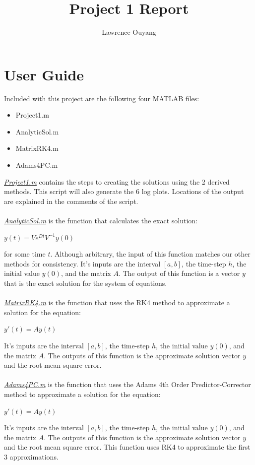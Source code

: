 \documentclass[12pt]{article}
\title{Project 1 Report}
\author{Lawrence Ouyang}
\begin{document}
\maketitle
\section{User Guide}
Included with this project are the following four MATLAB files:
\begin{itemize}
\item Project1.m
\item AnalyticSol.m
\item MatrixRK4.m 
\item Adams4PC.m
\end{itemize}

\underline{\textit{Project1.m}} contains the steps to creating the solutions using the 2 derived methods. This script will also generate the 6 log plots. Locations of the output are explained in the comments of the script.\\ \\

\underline{\textit{AnalyticSol.m}} is the function that calculates the exact solution:
\begin{center}
$y(t) = Ve^{Dt}V^{-1}y(0) $
\end{center}
for some time $t$. Although arbitrary, the input of this function matches our other methods for consistency. It's inputs are the interval $[a,b]$, the time-step $h$, the initial value $y(0)$, and the matrix $A$. The output of this function is a vector $y$ that is the exact solution for the system of equations.\\ \\

\underline{\textit{MatrixRK4.m}} is the function that uses the RK4 method to approximate a solution for the equation:
\begin{center}
$y'(t) = Ay(t) $
\end{center}
It's inputs are the interval $[a,b]$, the time-step $h$, the initial value $y(0)$, and the matrix $A$. The outputs of this function is the approximate solution vector $y$ and the root mean square error. \\ \\

\underline{\textit{Adams4PC.m}} is the function that uses the Adams 4th Order Predictor-Corrector method to approximate a solution for the equation:
\begin{center}
$y'(t) = Ay(t) $
\end{center}
It's inputs are the interval $[a,b]$, the time-step $h$, the initial value $y(0)$, and the matrix $A$. The outputs of this function is the approximate solution vector $y$ and the root mean square error. This function uses RK4 to approximate the first 3 approximations.\\ \\
\end{document}

